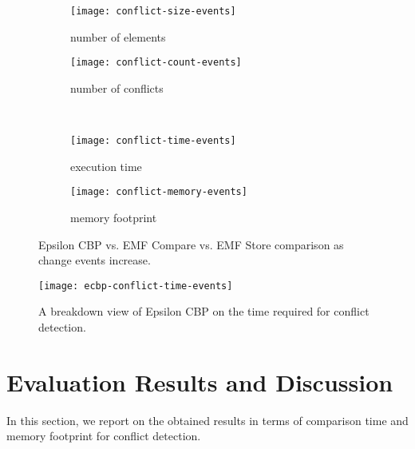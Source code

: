
\begin{figure*}[ht]
  \centering
  \begin{subfigure}[t]{0.495\linewidth}
    \texttt{[image: conflict-size-events]}
    \caption{number of elements}
    \label{fig:conflict-size-events}
  \end{subfigure}
  \hfill
  \begin{subfigure}[t]{0.495\linewidth}
    \texttt{[image: conflict-count-events]}
    \caption{number of conflicts}
    \label{fig:conflict-count-events}
  \end{subfigure}
  \\
  \begin{subfigure}[t]{0.495\linewidth}
    \texttt{[image: conflict-time-events]}
    \caption{execution time}
    \label{fig:conflict-time-events}
  \end{subfigure}
  \hfill
  \begin{subfigure}[t]{0.495\linewidth}
    \texttt{[image: conflict-memory-events]}
    \caption{memory footprint}
    \label{fig:conflict-memory-events}
  \end{subfigure}
  \caption{Epsilon CBP vs. EMF Compare vs. EMF Store comparison as change events increase.}
  \label{fig:conflict_events}
\end{figure*}

\begin{wrapfigure}[9]{r}{0.5\textwidth}
  \vspace{-25pt}
  \texttt{[image: ecbp-conflict-time-events]}
  \caption{A breakdown view of Epsilon CBP on the time required for conflict detection.}
  \label{fig:ecbp-conflict-time-events}
\end{wrapfigure}

\section{Evaluation Results and Discussion}
\label{sec:evaluation_discussion}
In this section, we report on the obtained results in terms of comparison time and memory footprint for conflict detection. 


